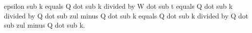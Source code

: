 epsilon sub k equals Q dot sub k divided by W dot sub t equals Q dot sub k divided by Q dot sub zul minus Q dot sub k equals Q dot sub k divided by Q dot sub zul minus Q dot sub k.
